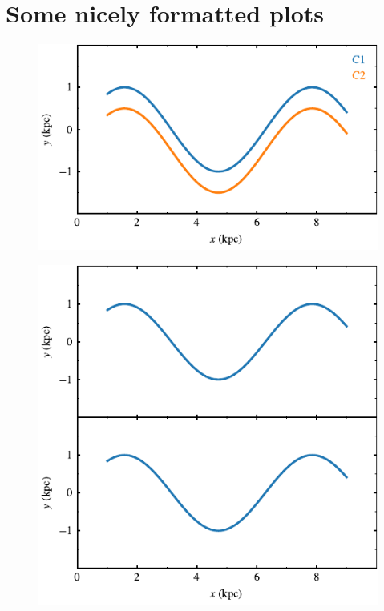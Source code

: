 \documentclass[usenatbib]{mnras}
\begin{document}
  

\section{Some nicely formatted plots}

\setcounter{figure}{-1}

\lipsum[1-3]

\begin{figure}
\includegraphics{../pdf/000.pdf}
\caption[]{\lipsum[66]}
\label{fig000}
\end{figure}

\lipsum[1-3]

\begin{figure}
\includegraphics{../pdf/001.pdf}
\caption[]{\lipsum[66]}
\label{fig001}
\end{figure}
\end{document}
